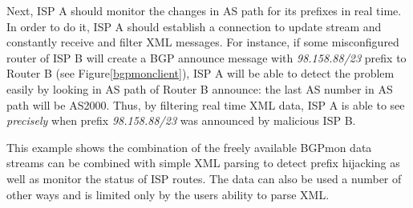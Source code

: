 Next, ISP A should monitor the changes in AS path for its prefixes in real time. In order to do it, ISP A should establish a connection to update stream and constantly receive and filter XML messages. For instance, if some misconfigured router of ISP B will create a BGP announce message with \emph{98.158.88/23} prefix to Router B (see Figure\ref{bgpmonclient}), ISP A will be able to detect the problem easily by looking in AS path of Router B announce: the last AS number in AS path will be AS2000. Thus, by filtering real time XML data, ISP A is able to see \emph{precisely} when prefix \emph{98.158.88/23} was announced by malicious ISP B.  

This example shows the combination of the freely available BGPmon data streams can be combined with simple XML parsing to detect prefix hijacking as well as monitor the status of ISP routes.    The data can also be used a number of other ways and is limited only by the users ability to parse XML.













